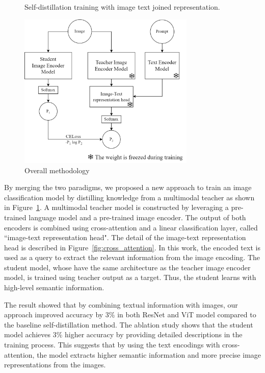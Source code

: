 \begin{figure}[h]
    \caption{Overall methodology}
    \label{fig:overall_method}
    Self-distillation training with image text joined representation.
    \begin{center}
        \includegraphics[width=0.75\textwidth]{Images/OverviewMethod.png}
    \end{center}
    \small
\end{figure}

By merging the two paradigms, we proposed a new approach to train an image classification model by distilling knowledge from a multimodal teacher as shown in Figure~\ref{fig:overall_method}.
A multimodal teacher model is constructed by leveraging a pre-trained language model and a pre-trained image encoder.
The output of both encoders is combined using cross-attention and a linear classification layer, called ``image-text representation head".
The detail of the image-text representation head is described in Figure~\ref{fig:cross_attention}.
In this work, the encoded text is used as a query to extract the relevant information from the image encoding.
The student model, whose have the same architecture as the teacher image encoder model, is trained using teacher output as a target.
Thus, the student learns with high-level semantic information.

The result showed that by combining textual information with images, our approach improved accuracy by 3\% in both ResNet  and ViT  model compared to the baseline self-distillation method.
The ablation study shows that the student model achieves 3\% higher accuracy by providing detailed descriptions in the training process.
This suggests that by using the text encodings with cross-attention, the model extracts higher semantic information and more precise image representations from the images.

